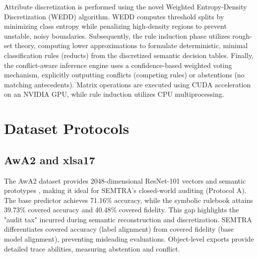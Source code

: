 \documentclass[make,supfile,submit,pdftex,moreauthors]{Definitions/mdpi}
\begin{document}
Attribute discretization is performed using the novel Weighted Entropy-Density Discretization (WEDD) algorithm. WEDD computes threshold splits by minimizing class entropy while penalizing high-density regions to prevent unstable, noisy boundaries. Subsequently, the rule induction phase utilizes rough-set theory, computing lower approximations to formulate deterministic, minimal classification rules (reducts) from the discretized semantic decision tables. Finally, the conflict-aware inference engine uses a confidence-based weighted voting mechanism, explicitly outputting conflicts (competing rules) or abstentions (no matching antecedents). Matrix operations are executed using CUDA acceleration on an NVIDIA GPU, while rule induction utilizes CPU multiprocessing.

\section{Dataset Protocols}
\label{sec:supp_dataset_protocols}

\subsection{AwA2 and xlsa17}
\label{subsec:supp_awa2}

The AwA2 dataset provides 2048-dimensional ResNet-101 vectors and semantic prototypes \cite{Xian2019AwA2,AwA2Website}, making it ideal for SEMTRA's closed-world auditing (Protocol A). The base predictor achieves 71.16\% accuracy, while the symbolic rulebook attains 39.73\% covered accuracy and 40.48\% covered fidelity. This gap highlights the "audit tax" incurred during semantic reconstruction and discretization. SEMTRA differentiates covered accuracy (label alignment) from covered fidelity (base model alignment), preventing misleading evaluations. Object-level exports provide detailed trace abilities, measuring abstention and conflict.
\end{document}
